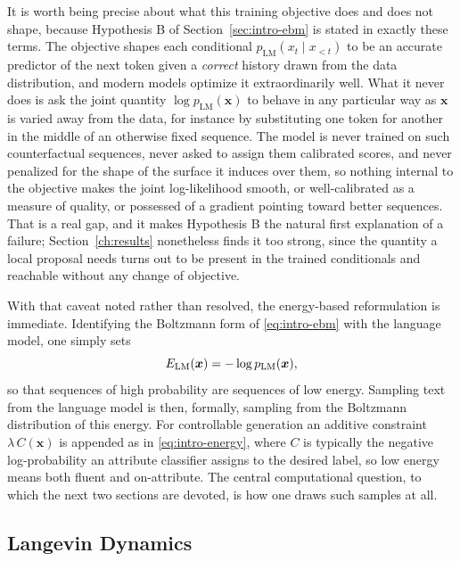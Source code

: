 It is worth being precise about what this training objective does and does not shape, because Hypothesis B of Section~\ref{sec:intro-ebm} is stated in exactly these terms. The objective shapes each conditional $p_{\text{LM}}(x_t \mid x_{<t})$ to be an accurate predictor of the next token given a \emph{correct} history drawn from the data distribution, and modern models optimize it extraordinarily well. What it never does is ask the joint quantity $\log p_{\text{LM}}(\bm{x})$ to behave in any particular way as $\bm{x}$ is varied away from the data, for instance by substituting one token for another in the middle of an otherwise fixed sequence. The model is never trained on such counterfactual sequences, never asked to assign them calibrated scores, and never penalized for the shape of the surface it induces over them, so nothing internal to the objective makes the joint log-likelihood smooth, or well-calibrated as a measure of quality, or possessed of a gradient pointing toward better sequences. That is a real gap, and it makes Hypothesis B the natural first explanation of a failure; Section~\ref{ch:results} nonetheless finds it too strong, since the quantity a local proposal needs turns out to be present in the trained conditionals and reachable without any change of objective.

With that caveat noted rather than resolved, the energy-based reformulation is immediate. Identifying the Boltzmann form of \eqref{eq:intro-ebm} with the language model, one simply sets
\begin{equation}
    E_{\text{LM}}(\bm{x}) = -\log p_{\text{LM}}(\bm{x}),
    \label{eq:bg-energy}
\end{equation}
so that sequences of high probability are sequences of low energy. Sampling text from the language model is then, formally, sampling from the Boltzmann distribution of this energy. For controllable generation an additive constraint $\lambda\, C(\bm{x})$ is appended as in \eqref{eq:intro-energy}, where $C$ is typically the negative log-probability an attribute classifier assigns to the desired label, so low energy means both fluent and on-attribute. The central computational question, to which the next two sections are devoted, is how one draws such samples at all.

\subsection{Langevin Dynamics}
\label{sec:bg-langevin}

